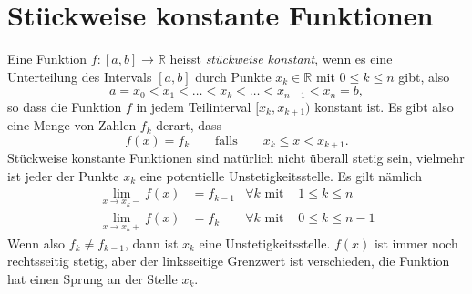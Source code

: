 %
%
%
\section{Stückweise konstante Funktionen%
\label{section:stueckweise}}
Eine Funktion $f\colon[a,b]\to\mathbb R$ heisst {\em stückweise konstant},
wenn es eine Unterteilung des Intervals $[a,b]$ durch Punkte
%
$x_k\in\mathbb R$ mit $0\le k\le n$ gibt, also
\[
a=x_0 < x_1 < \dots < x_k < \dots < x_{n-1} < x_n = b,
\]
so dass die Funktion $f$ in jedem Teilinterval $[x_k,x_{k+1})$
konstant ist.
Es gibt also eine Menge von Zahlen $f_k$ derart, dass
\begin{equation}
f(x)
=
f_k
\qquad\text{falls}\qquad
x_k \le x < x_{k+1}.
\label{buch:stückweisef}
\end{equation}
Stückweise konstante Funktionen sind natürlich nicht überall stetig sein,
vielmehr ist jeder der Punkte $x_k$ eine potentielle Unstetigkeitsstelle.
Es gilt nämlich
\begin{equation*}
\begin{aligned}
\lim_{x\to x_k-} f(x)
&=
f_{k-1}&\forall k\text{ mit }&1\le k \le n
\\
\lim_{x\to x_k+} f(x)
&=
f_k&\forall k\text{ mit }&0\le k \le n-1
\end{aligned}
\end{equation*}
Wenn also $f_k\ne f_{k-1}$, dann ist $x_k$ eine Unstetigkeitsstelle.
$f(x)$ ist immer noch rechtsseitig stetig, aber der linksseitige
Grenzwert ist verschieden, die Funktion hat einen Sprung an der
Stelle $x_k$.

